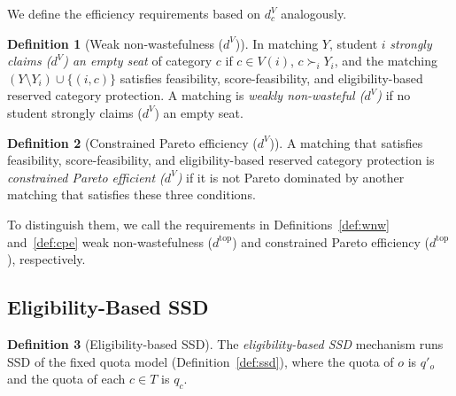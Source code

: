 \documentclass[a4paper,twoside]{article}
\theoremstyle{definition}
\newtheorem{definition}{Definition}
\newcommand{\dtop}{d^{\mathrm{top}}}
\newcommand{\dV}{d^{V}}
\begin{document}
We define the efficiency requirements based on $\dV_c$ analogously.

\begin{definition}[Weak non-wastefulness ($\dV$)]
\label{def:wnwV}
In matching $Y$, student $i$ \emph{strongly claims ($\dV$) an empty seat} of category
$c$ if $c\in V(i)$, $c\succ_i Y_i$, and the matching $(Y\setminus Y_i)\cup\{(i,c)\}$
satisfies feasibility, score-feasibility, and eligibility-based reserved category
protection.
A matching is \emph{weakly non-wasteful ($\dV$)} if no student strongly claims ($\dV$)
an empty seat.
\end{definition}

\begin{definition}[Constrained Pareto efficiency ($\dV$)]
\label{def:cpeV}
A matching that satisfies feasibility, score-feasibility, and eligibility-based reserved
category protection is \emph{constrained Pareto efficient ($\dV$)} if it is not Pareto
dominated by another matching that satisfies these three conditions.
\end{definition}

To distinguish them, we call the requirements in Definitions~\ref{def:wnw}
and~\ref{def:cpe} weak non-wastefulness ($\dtop$) and constrained Pareto efficiency
($\dtop$), respectively.

\subsection{Eligibility-Based SSD}

\begin{definition}[Eligibility-based SSD]
\label{def:essd}
The \emph{eligibility-based SSD} mechanism runs SSD of the fixed quota model
(Definition~\ref{def:ssd}), where the quota of $o$ is $q'_o$ and the quota of each
$c\in T$ is $q_c$.
\end{definition}
\end{document}
